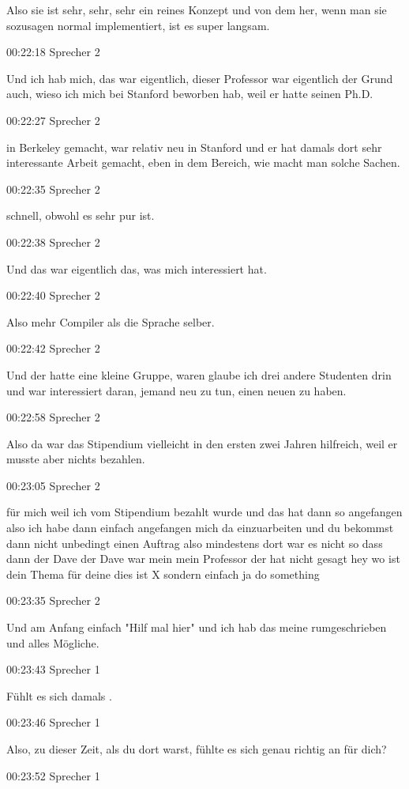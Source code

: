 Also sie ist sehr, sehr, sehr ein reines Konzept und von dem her, wenn
man sie sozusagen normal implementiert, ist es super langsam.

00:22:18 Sprecher 2

Und ich hab mich, das war eigentlich, dieser Professor war eigentlich
der Grund auch, wieso ich mich bei Stanford beworben hab, weil er hatte
seinen Ph.D.

00:22:27 Sprecher 2

in Berkeley gemacht, war relativ neu in Stanford und er hat damals dort
sehr interessante Arbeit gemacht, eben in dem Bereich, wie macht man
solche Sachen.

00:22:35 Sprecher 2

schnell, obwohl es sehr pur ist.

00:22:38 Sprecher 2

Und das war eigentlich das, was mich interessiert hat.

00:22:40 Sprecher 2

Also mehr Compiler als die Sprache selber.

00:22:42 Sprecher 2

Und der hatte eine kleine Gruppe, waren glaube ich drei andere Studenten
drin und war interessiert daran, jemand neu zu tun, einen neuen zu
haben.

00:22:58 Sprecher 2

Also da war das Stipendium vielleicht in den ersten zwei Jahren
hilfreich, weil er musste aber nichts bezahlen.

00:23:05 Sprecher 2

für mich weil ich vom Stipendium bezahlt wurde und das hat dann so
angefangen also ich habe dann einfach angefangen mich da einzuarbeiten
und du bekommst dann nicht unbedingt einen Auftrag also mindestens dort
war es nicht so dass dann der Dave der Dave war mein mein Professor der
hat nicht gesagt hey wo ist dein Thema für deine dies ist X sondern
einfach ja do something

00:23:35 Sprecher 2

Und am Anfang einfach "Hilf mal hier" und ich hab das meine
rumgeschrieben und alles Mögliche.

00:23:43 Sprecher 1

Fühlt es sich damals .

00:23:46 Sprecher 1

Also, zu dieser Zeit, als du dort warst, fühlte es sich genau richtig an
für dich?

00:23:52 Sprecher 1


